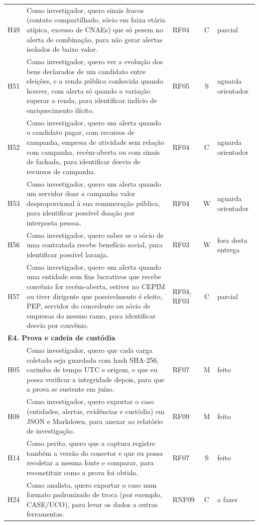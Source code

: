 \begin{small}
\begin{longtable}{lp{7.9cm}p{1.3cm}cp{1.9cm}}
H49 & Como investigador, quero sinais fracos (contato compartilhado, sócio em faixa etária atípica, excesso de CNAEs) que só pesem no alerta de combinação, para não gerar alertas isolados de baixo valor. & RF04 & C & parcial \\
H51 & Como investigador, quero ver a evolução dos bens declarados de um candidato entre eleições, e a renda pública conhecida quando houver, com alerta só quando a variação superar a renda, para identificar indício de enriquecimento ilícito. & RF05 & S & aguarda orientador \\
H52 & Como investigador, quero um alerta quando o candidato pagar, com recursos de campanha, empresa de atividade sem relação com campanha, recém-aberta ou com sinais de fachada, para identificar desvio de recursos de campanha. & RF04 & C & aguarda orientador \\
H53 & Como investigador, quero um alerta quando um servidor doar a campanha valor desproporcional à sua remuneração pública, para identificar possível doação por interposta pessoa. & RF04 & W & aguarda orientador \\
H56 & Como investigador, quero saber se o sócio de uma contratada recebe benefício social, para identificar possível laranja. & RF03 & W & fora desta entrega \\
H57 & Como investigador, quero um alerta quando uma entidade sem fins lucrativos que recebe convênio for recém-aberta, estiver no CEPIM ou tiver dirigente que possivelmente é eleito, PEP, servidor do concedente ou sócio de empresas do mesmo ramo, para identificar desvio por convênio. & RF04, RF03 & C & parcial \\
\multicolumn{5}{l}{\textbf{E4. Prova e cadeia de custódia}} \\
H05 & Como investigador, quero que cada carga coletada seja guardada com hash SHA-256, carimbo de tempo UTC e origem, e que eu possa verificar a integridade depois, para que a prova se sustente em juízo. & RF07 & M & feito \\
H08 & Como investigador, quero exportar o caso (entidades, alertas, evidências e custódia) em JSON e Markdown, para anexar ao relatório de investigação. & RF09 & M & feito \\
H14 & Como perito, quero que a captura registre também a versão do conector e que eu possa recoletar a mesma fonte e comparar, para reconstituir como a prova foi obtida. & RF07 & S & feito \\
H24 & Como analista, quero exportar o caso num formato padronizado de troca (por exemplo, CASE/UCO), para levar os dados a outras ferramentas. & RNF09 & C & a fazer \\

\end{longtable}
\end{small}
